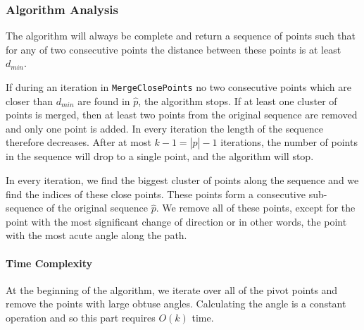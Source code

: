 \begin{algorithm}
	\BlankLine


	\BlankLine


	\label{alg:find_corners}
\end{algorithm}

\subsubsection{Algorithm Analysis}

The algorithm will always be complete and return a sequence of points such that for any of two consecutive points the distance between these points is at least $d_{min}$. 

If during an iteration in \texttt{MergeClosePoints} no two consecutive points which are closer than $d_{min}$ are found in $\hat{p}$, the algorithm stops. If at least one cluster of points is merged, then at least two points from the original sequence are removed and only one point is added. In every iteration the length of the sequence therefore decreases. After at most $k-1=|\hat{p}|-1$ iterations, the number of points in the sequence will drop to a single point, and the algorithm will stop.

In every iteration, we find the biggest cluster of points along the sequence and we find the indices of these close points. These points form a consecutive sub-sequence of the original sequence $\hat{p}$. We remove all of these points, except for the point with the most significant change of direction or in other words, the point with the most acute angle along the path.

\paragraph{Time Complexity}

At the beginning of the algorithm, we iterate over all of the pivot points and remove the points with large obtuse angles. Calculating the angle is a constant operation and so this part requires $O(k)$ time.

